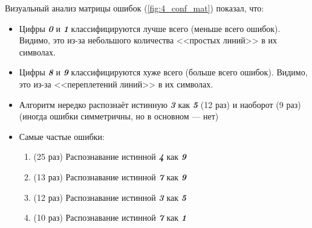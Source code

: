 \documentclass[12pt]{article}
\begin{document}
Визуальный анализ матрицы ошибок (\autoref{fig:4_conf_mat}) показал, что:
\begin{itemize}
    \item Цифры \textit{\textbf{0}} и \textit{\textbf{1}} классифицируются лучше всего (меньше всего ошибок). Видимо, это из-за небольшого количества <<простых линий>> в их символах.
    \item Цифры \textit{\textbf{8}} и \textit{\textbf{9}} классифицируются хуже всего (больше всего ошибок). Видимо, это из-за <<переплетений линий>> в их символах.
    \item Алгоритм нередко распознаёт истинную \textbf{\textit{3}} как \textbf{\textit{5}} (12 раз) и наоборот (9 раз) (иногда ошибки симметричны, но в основном --- нет)
    \item Самые частые ошибки:
    \begin{enumerate}
        \item (25 раз) Распознавание истинной \textit{\textbf{4}} как \textit{\textbf{9}}
        \item (13 раз) Распознавание истинной \textit{\textbf{7}} как \textit{\textbf{9}}
        \item (12 раз) Распознавание истинной \textit{\textbf{3}} как \textit{\textbf{5}}
        \item (10 раз) Распознавание истинной \textit{\textbf{7}} как \textit{\textbf{1}}
    \end{enumerate}
\end{itemize}
\end{document}
